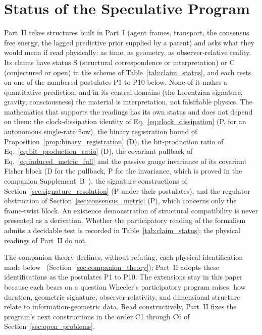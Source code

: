 
\section{Status of the Speculative Program}\label{sec:part2_preamble}

Part~II takes structures built in Part~I (agent frames, transport, the consensus free energy, the lagged predictive prior supplied by a parent) and asks what they would mean if read physically: as time, as geometry, as observer-relative reality. Its claims have status S (structural correspondence or interpretation) or C (conjectured or open) in the scheme of Table~\ref{tab:claim_status}, and each rests on one of the numbered postulates P1 to P10 below. None of it makes a quantitative prediction, and in its central domains (the Lorentzian signature, gravity, consciousness) the material is interpretation, not falsifiable physics. The mathematics that supports the readings has its own status and does not depend on them: the clock-dissipation identity of Eq.~\eqref{eq:clock_dissipation} (P, for an autonomous single-rate flow), the binary registration bound of Proposition~\ref{prop:binary_registration} (D), the bit-production ratio of Eq.~\eqref{eq:bit_production_ratio} (D), the covariant pullback of Eq.~\eqref{eq:induced_metric_full} and the passive gauge invariance of its covariant Fisher block (D for the pullback, P for the invariance, which is proved in the companion Supplement~B~\cite[Ch.~B2]{DennisGaugeVFESuppB2026}), the signature constructions of Section~\ref{sec:signature_resolution} (P under their postulates), and the regulator obstruction of Section~\ref{sec:consensus_metric} (P), which concerns only the frame-twist block. An existence demonstration of structural compatibility is never presented as a derivation. Whether the participatory reading of the formalism admits a decidable test is recorded in Table~\ref{tab:claim_status}; the physical readings of Part~II do not.

The companion theory declines, without refuting, each physical identification made below~\cite[Chs.~1 and~14]{DennisGaugeVFE2026} (Section~\ref{sec:companion_theory}); Part~II adopts these identifications as the postulates P1 to P10. The extensions stay in this paper because each bears on a question Wheeler's participatory program raises: how duration, geometric signature, observer-relativity, and dimensional structure relate to information-geometric data. Read constructively, Part~II fixes the program's next constructions in the order C1 through C6 of Section~\ref{sec:open_problems}.

